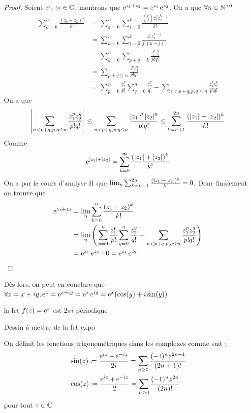 \begin{proof}
    Soient $z_1,z_2\in \mathbb{C},$ montrons que $\operatorname{e}^{z_1+z_2}=\operatorname{e}^{z_1}\operatorname{e}^{z_2}$. On a que $\forall n\in \mathbb{N}^{>0}$
    \begin{align*}
        \sum_{k=0}^{n}\frac{(z_1+z_2)^k}{k!}&=\sum_{k=0}^n\sum_{j=0}^k\frac{\binom{k}{j}z_1^jz_2^{k-j}}{k!}\\
        &=\sum_{k=0}^n\sum_{j=0}^k\frac{z_1^jz_2^{k-j}}{j!(k-j)!}\\
        &=\sum_{k=0}^n\sum_{p+q=k}\frac{z_1^pz_2^q}{p!q!}\\
        &=\sum_{p+q\le n}\frac{z_1^pz_2^q}{p!q!}\\
        &=\sum_{p=0}^n\frac{z_1^p}{p!}\sum_{q=0}^n\frac{z_2^q}{q!}-\sum_{n<p+q,p,q\le n}\frac{z_1^pz_2^q}{p!q!}
    \end{align*}
    On a que 
    \begin{equation*}
        \left| \sum_{n<p+q,p,q\le n}\frac{z_1^pz_2^q}{p!q!} \right|\le\sum_{n<p+q,p,q\le n}\frac{\left| z_1 \right|^p\left| z_2 \right|^q}{p!q!}\le\sum_{k=n+1}^{2n}\frac{(\left| z_1 \right|+\left| z_2 \right|)^k}{k!}
    \end{equation*}
    Comme $$\operatorname{e}^{\left| z_1 \right|+\left| z_2 \right|}=\sum_{k=0}^{\infty}\frac{(\left| z_1 \right|+\left| z_2 \right|)^k}{k!}$$
    On a par le cours d'analyse II que $\lim_n\sum_{k=n+1}^{2n}\frac{(\left| z_1 \right|+\left| z_2 \right|)^k}{k!}=0$. Donc finalement on trouve que 
    \begin{align*}
       \operatorname{e}^{z_1+z_2}&=\lim_n\sum_{k=0}^n \frac{(z_1+z_2)^k}{k!}\\
       &=\lim_n\Bigg(\sum_{p=0}^n\frac{z_1^p}{p!}\sum_{q=0}^n\frac{z_2^q}{q!}-\sum_{n<p+q,p,q\le n}\frac{z_1^pz_2^q}{p!q!}\Bigg)\\
       &=\operatorname{e}^{z_1}\operatorname{e}^{z_2}-0=\operatorname{e}^{z_1}\operatorname{e}^{z_2}
    \end{align*}
\end{proof}
Dès lors, on peut en conclure que $\forall z=x+i y, \operatorname{e}^z=\operatorname{e}^{x+i y}=\operatorname{e}^x\operatorname{e}^{i y}=\operatorname{e}^{x}(\cos(y)+i\sin(y))$
\begin{remarque}
    la fct $f(z)=\operatorname{e}^z$ est $2\pi i$ périodique
\end{remarque}
Dessin à mettre de la fct expo
\begin{definition}
    On définit les fonctions trigonométriques dans les complexes comme suit ;
    \begin{align*}
        &\sin(z)\coloneqq\frac{\operatorname{e}^{i z}-\operatorname{e}^{-i z}}{2i }=\sum_{n\ge0}\frac{(-1)^nz^{2n+1}}{(2n+1)!}\\
        &\cos(z)\coloneqq\frac{\operatorname{e}^{i z}+\operatorname{e}^{-i z}}{2}=\sum_{n\ge0}\frac{(-1)^nz^{2n}}{(2n)!}\\
    \end{align*}
    pour tout $z\in\mathbb{C}$
\end{definition}
